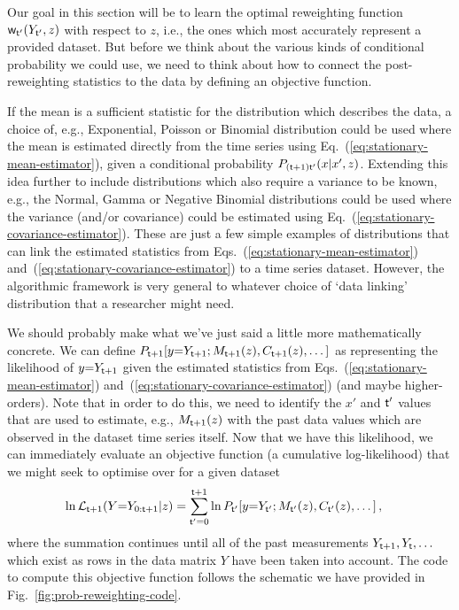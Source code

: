 Our goal in this section will be to learn the optimal reweighting function ${\sf w}_{{\sf t}'}(Y_{{\sf t}'},z)$ with respect to $z$, i.e., the ones which most accurately represent a provided dataset. But before we think about the various kinds of conditional probability we could use, we need to think about how to connect the post-reweighting statistics to the data by defining an objective function. 

If the mean is a sufficient statistic for the distribution which describes the data, a choice of, e.g., Exponential, Poisson or Binomial distribution could be used where the mean is estimated directly from the time series using Eq.~(\ref{eq:stationary-mean-estimator}), given a conditional probability $P_{({\sf t}+1){\sf t}'}(x\vert x',z)$. Extending this idea further to include distributions which also require a variance to be known, e.g., the Normal, Gamma or Negative Binomial distributions could be used where the variance (and/or covariance) could be estimated using Eq.~(\ref{eq:stationary-covariance-estimator}). These are just a few simple examples of distributions that can link the estimated statistics from Eqs.~(\ref{eq:stationary-mean-estimator}) and~(\ref{eq:stationary-covariance-estimator}) to a time series dataset. However, the algorithmic framework is very general to whatever choice of `data linking' distribution that a researcher might need.

We should probably make what we've just said a little more mathematically concrete. We can define $P_{{\sf t}+1}[y{=}Y_{{\sf t}+1};M_{{\sf t}+1}(z),C_{{\sf t}+1}(z),\dots ]$ as representing the likelihood of $y{=}Y_{{\sf t}+1}$ given the estimated statistics from Eqs.~(\ref{eq:stationary-mean-estimator}) and~(\ref{eq:stationary-covariance-estimator}) (and maybe higher-orders). Note that in order to do this, we need to identify the $x'$ and ${\sf t}'$ values that are used to estimate, e.g., $M_{{\sf t}+1}(z)$ with the past data values which are observed in the dataset time series itself. Now that we have this likelihood, we can immediately evaluate an objective function (a cumulative log-likelihood) that we might seek to optimise over for a given dataset 
\begin{align}
\ln {\cal L}_{{\sf t}+1}(Y{=}Y_{0:{\sf t}+1}\vert z) &= \sum_{{\sf t}'=0}^{{\sf t}+1} \ln P_{{\sf t}'}[y{=}Y_{{\sf t}'};M_{{\sf t}'}(z),C_{{\sf t}'}(z),\dots ] \,, \label{eq:log-likelihood-reweighting}
\end{align}
where the summation continues until all of the past measurements $Y_{{\sf t}+1}, Y_{{\sf t}}, \dots$ which exist as rows in the data matrix $Y$ have been taken into account. The code to compute this objective function follows the schematic we have provided in Fig.~\ref{fig:prob-reweighting-code}.

